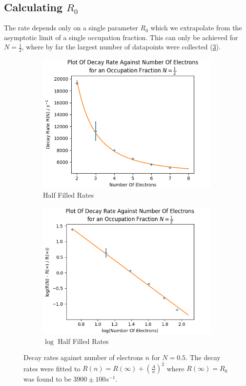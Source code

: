 \subsection{Calculating \(R_0\)}\label{sec:calculating R0}
The rate depends only on a single
parameter \(R_0\) which we extrapolate
from the asymptotic
limit of a single
occupation fraction. This can
only be achieved for
\(N=\frac{1}{2}\), where
by far the largest number of
datapoints were collected (\cref{fig:half filled rate}).
\begin{figure}[htbp]
    \centering
    \begin{subfigure}{0.45\linewidth}
        \centering
        \includegraphics[width =0.9 \linewidth]{Figures/Simulation/Decay rate against electrons N=0.5.png}
        \caption{Half Filled Rates
        }\label{sub@fig:plot of half filled rates}
    \end{subfigure}
    \hfill
    \begin{subfigure}{0.45\linewidth}
        \centering
        \includegraphics[width = 0.9\linewidth]{Figures/Simulation/Decay rate against electrons N=0.5 log.png}
        \caption{\(\log{}\) Half Filled Rates
        }\label{sub@fig:log plot of half fileld rates}
    \end{subfigure}
    \caption{Decay rates against
    number of electrons \(n\) for
    \(N=0.5\). The decay rates were
    fitted to
    \(R(n) = R(\infty) + {(\frac{A}{n})}^2\)
    where \(R(\infty) = R_0\) was
    found to be \(3900\pm 100s^{-1}\).
    }\label{fig:half filled rate}
\end{figure}
